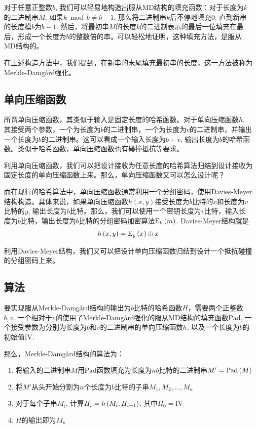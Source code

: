 对于任意正整数$b$, 我们可以轻易地构造出服从MD结构的填充函数：对于长度为$k$的二进制串$M$, 如果$k\bmod b\neq b-1$, 那么将二进制串$k$后不停地填充$0$, 直到新串的长度模$b$为$b-1$. 然后，将最初串$M$的长度$k$的二进制表示的最后一位填充在最后，形成一个长度为$b$的整数倍的串。可以轻松地证明，这种填充方法，是服从MD结构的。\par
在上述构造方法中，我们提到，在新串的末尾填充最初串的长度，这一方法被称为Merkle-Damg\aa rd强化。
\subsection{单向压缩函数}
所谓单向压缩函数，其类似于输入是固定长度的哈希函数。对于单向压缩函数$h$, 其接受两个参数，一个为长度为$b$的二进制串，一个为长度为$v$的二进制串，并输出一个长度为$b$的二进制串。这可以看成一个输入长度为$b+v$, 输出长度为$b$的哈希函数。类似于哈希函数，单向压缩函数也有碰撞抵抗等要求。\par
利用单向压缩函数，我们可以把设计接收为任意长度的哈希算法归结到设计接收为固定长度的单向压缩函数上来。那么，单向压缩函数又可以怎么设计呢？\par
而在现行的哈希算法中，单向压缩函数通常利用一个分组密码，使用Davies-Meyer结构构造。具体来说，如果单向压缩函数$h(x, y)$接受长度为$b$比特的$x$和长度为$v$比特的$y$, 输出长度为$b$比特。那么，我们可以使用一个密钥长度为$v$比特，输入长度为$b$比特，输出长度为$b$比特的分组密码加密算法${\mathrm{E}_{k}\left({m}\right)}$. Davies-Meyer结构就是
\begin{equation}
h\left( {x, y}\right)={\mathrm{E}_{y}\left({x}\right)}\oplus x
\end{equation}

利用Davies-Meyer结构，我们又可以把设计单向压缩函数归结到设计一个抵抗碰撞的分组密码上来。
\subsection{算法}
要实现服从Merkle-Damg\aa rd结构的输出为$b$比特的哈希函数$H$，需要两个正整数$b, v$. 一个相对于$v$的使用了Merkle-Damg\aa rd强化的服从MD结构的填充函数$\mathrm{Pad}$, 一个接受参数为分别为长度为$b$和$v$的二进制串的单向压缩函数$h$, 以及一个长度为$b$的初始值$\mathrm{IV}$.\par
那么，Merkle-Damg\aa rd结构的算法为：
\begin{enumerate}
	\item 将输入的二进制串$M$用$\mathrm{Pad}$函数填充为长度为$nb$比特的二进制串$M'=\mathrm{Pad}\left( {M}\right)$
	\item 将$M'$从头开始分割为$n$个长度为$b$比特的子串$M_1, M_2, \ldots, M_n$
	\item 对于每个子串$M_i$, 计算$H_i=h\left( {M_i, H_{i-1}}\right)$, 其中$H_0=\mathrm{IV}$
	\item $H$的输出即为$M_n$
\end{enumerate}

